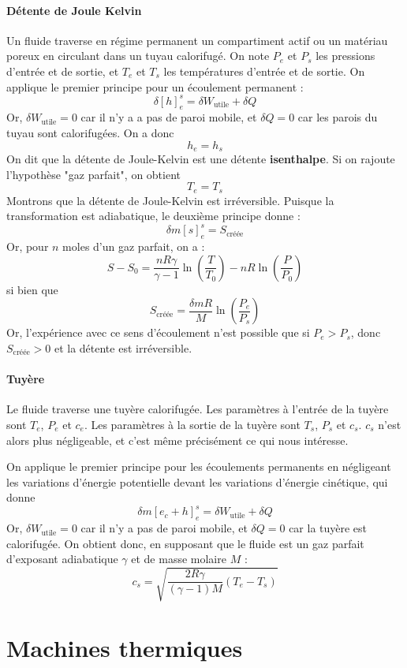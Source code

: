 \documentclass[french]{book}
\theoremstyle{plain}
\theoremstyle{definition}
\theoremstyle{remark}
\begin{document}
\paragraph{Détente de Joule Kelvin}
Un fluide traverse en régime permanent un compartiment actif ou un matériau poreux en circulant dans un tuyau calorifugé. On note $P_e$ et $P_s$ les pressions d'entrée et de sortie, et $T_e$ et $T_s$ les températures d'entrée et de sortie. On applique le premier principe pour un écoulement permanent : $$\delta\left[h\right]_e^s=\delta W_\text{utile}+\delta Q$$ Or, $\delta W_\text{utile}=0$ car il n'y a a pas de paroi mobile, et $\delta Q=0$ car les parois du tuyau sont calorifugées. On a donc $$h_e=h_s$$ On dit que la détente de Joule-Kelvin est une détente \textbf{isenthalpe}. Si on rajoute l'hypothèse "gaz parfait", on obtient $$T_e=T_s$$ Montrons que la détente de Joule-Kelvin est irréversible. Puisque la transformation est adiabatique, le deuxième principe donne : $$\delta m\left[s\right]_e^s=S_\text{créée}$$ Or, pour $n$ moles d'un gaz parfait, on a : $$S-S_0=\frac{nR\gamma}{\gamma-1}\ln\left(\frac{T}{T_0}\right)-nR\ln\left(\frac{P}{P_0}\right)$$si bien que $$S_\text{créée}=\frac{\delta m R}{M}\ln\left(\frac{P_e}{P_s}\right)$$ Or, l'expérience avec ce sens d'écoulement n'est possible que si $P_e>P_s$, donc $S_\text{créée}>0$ et la détente est irréversible.
\paragraph{Tuyère}
Le fluide traverse une tuyère calorifugée. Les paramètres à l'entrée de la tuyère sont $T_e$, $P_e$ et $c_e$. Les paramètres à la sortie de la tuyère sont $T_s$, $P_s$ et $c_s$. $c_s$ n'est alors plus négligeable, et c'est même précisément ce qui nous intéresse. \\ \par On applique le premier principe pour les écoulements permanents en négligeant les variations d'énergie potentielle devant les variations d'énergie cinétique, qui donne $$\delta m\left[e_c+h\right]_e^s=\delta W_\text{utile}+\delta Q$$ Or, $\delta W_\text{utile}=0$ car il n'y a pas de paroi mobile, et $\delta Q=0$ car la tuyère est calorifugée. On obtient donc, en supposant que le fluide est un gaz parfait d'exposant adiabatique $\gamma$ et de masse molaire $M$ : $$c_s=\sqrt{\frac{2R\gamma}{(\gamma-1)M}\left(T_e-T_s\right)}$$
\section{Machines thermiques}
\end{document}
